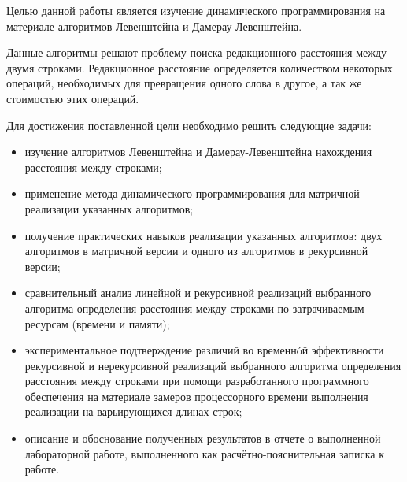 \Introduction

Целью данной работы является изучение динамического программирования на материале алгоритмов Левенштейна и Дамерау-Левенштейна.

Данные алгоритмы решают проблему поиска редакционного расстояния между двумя строками. Редакционное расстояние определяется количеством некоторых операций, необходимых для превращения одного слова в другое, а так же стоимостью этих операций.

Для достижения поставленной цели необходимо решить следующие задачи:

\begin{itemize}
    \item изучение алгоритмов Левенштейна и Дамерау-Левенштейна нахождения расстояния между строками;
    \item применение метода динамического программирования для матричной реализации указанных алгоритмов;
    \item получение практических навыков реализации указанных алгоритмов: двух алгоритмов в матричной версии и одного из алгоритмов в рекурсивной версии;
    \item сравнительный анализ линейной и рекурсивной реализаций выбранного алгоритма определения расстояния между строками по затрачиваемым ресурсам (времени и памяти);
    \item экспериментальное подтверждение различий во временнóй эффективности рекурсивной и нерекурсивной реализаций выбранного алгоритма определения расстояния между строками при помощи разработанного программного обеспечения на материале замеров процессорного времени выполнения реализации на варьирующихся длинах строк;
    \item описание и обоснование полученных результатов в отчете о выполненной лабораторной работе, выполненного как расчётно-пояснительная записка к работе.
\end{itemize}

